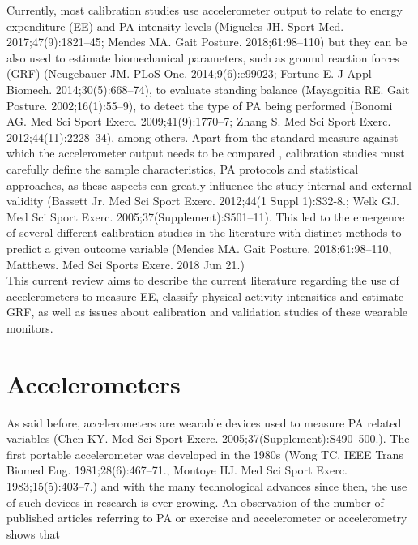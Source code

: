 \documentclass[11pt]{article}
\begin{document}
\noindent
Currently, most calibration studies use accelerometer output to relate to energy expenditure (EE) and PA intensity levels {\tiny (Migueles JH. Sport Med. 2017;47(9):1821–45; Mendes MA. Gait Posture. 2018;61:98–110)} but they can be also used to estimate biomechanical parameters, such as ground reaction forces (GRF) {\tiny (Neugebauer JM. PLoS One. 2014;9(6):e99023; Fortune E. J Appl Biomech. 2014;30(5):668–74)}, to evaluate standing balance	{\tiny (Mayagoitia RE. Gait Posture. 2002;16(1):55–9)}, to detect the type of PA being performed {\tiny (Bonomi AG. Med Sci Sport Exerc. 2009;41(9):1770–7; Zhang S. Med Sci Sport Exerc. 2012;44(11):2228–34)}, among others. Apart from the standard measure against which the accelerometer output needs to be compared	, calibration studies must carefully define the sample characteristics, PA protocols and statistical approaches, as these aspects can greatly influence the study internal and external validity {\tiny (Bassett  Jr. Med Sci Sport Exerc. 2012;44(1 Suppl 1):S32-8.; Welk GJ. Med Sci Sport Exerc. 2005;37(Supplement):S501–11)}. This led to the emergence of several different calibration studies in the literature with distinct methods to predict a given outcome variable {\tiny (Mendes MA. Gait Posture. 2018;61:98–110, Matthews. Med Sci Sports Exerc. 2018 Jun 21.)} 	\\

\noindent
This current review aims to describe the current literature regarding the use of accelerometers to measure EE, classify physical activity intensities and estimate GRF, as well as issues about calibration and validation studies of these wearable monitors.

\section*{Accelerometers}

As said before, accelerometers are wearable devices used to measure PA related variables {\tiny (Chen KY. Med Sci Sport Exerc. 2005;37(Supplement):S490–500.)}. The first portable accelerometer was developed in the 1980s {\tiny (Wong TC. IEEE Trans Biomed Eng. 1981;28(6):467–71., Montoye HJ. Med Sci Sport Exerc. 1983;15(5):403–7.)} and with the many technological advances since then, the use of such devices in research is ever growing. An observation of the number of published articles referring to PA or exercise and accelerometer or accelerometry shows that
\end{document}
